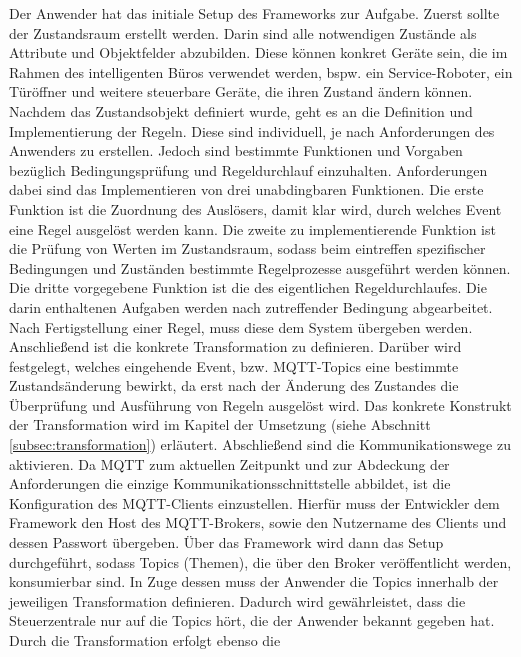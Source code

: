         Der Anwender hat das initiale Setup des Frameworks zur Aufgabe. Zuerst sollte der Zustandsraum erstellt werden. 
        Darin sind alle notwendigen Zustände als Attribute und Objektfelder abzubilden. Diese können konkret Geräte sein, die im Rahmen des 
        intelligenten Büros verwendet werden, bspw. ein Service-Roboter, ein Türöffner und weitere steuerbare Geräte, die 
        ihren Zustand ändern können. Nachdem das Zustandsobjekt 
        definiert wurde, geht es an die Definition und Implementierung der Regeln. Diese sind individuell, je nach 
        Anforderungen des Anwenders zu erstellen. Jedoch sind bestimmte Funktionen und Vorgaben bezüglich Bedingungsprüfung 
        und Regeldurchlauf einzuhalten. Anforderungen dabei sind das Implementieren von drei unabdingbaren Funktionen. 
        Die erste Funktion ist die Zuordnung des Auslösers, damit klar wird, durch welches Event eine Regel ausgelöst werden kann. 
        Die zweite zu implementierende Funktion ist die Prüfung von Werten im Zustandsraum, sodass beim eintreffen spezifischer 
        Bedingungen und Zuständen bestimmte Regelprozesse ausgeführt werden können. Die dritte vorgegebene Funktion ist die 
        des eigentlichen Regeldurchlaufes. Die darin enthaltenen Aufgaben werden nach zutreffender Bedingung abgearbeitet.
        \\
        Nach Fertigstellung einer Regel, muss diese dem System übergeben werden. Anschließend ist die 
        konkrete Transformation zu definieren. Darüber wird festgelegt, welches eingehende Event, bzw. \acs{MQTT}-Topics 
        eine bestimmte Zustandsänderung bewirkt, da erst nach der Änderung des Zustandes die Überprüfung und Ausführung 
        von Regeln ausgelöst wird. Das konkrete Konstrukt der Transformation wird im Kapitel der Umsetzung (siehe Abschnitt \ref{subsec:transformation}) 
        erläutert. Abschließend sind die Kommunikationswege zu aktivieren. 
        Da \acs{MQTT} zum aktuellen Zeitpunkt und zur Abdeckung der Anforderungen die einzige Kommunikationsschnittstelle 
        abbildet, ist die Konfiguration des \acs{MQTT}-Clients einzustellen. Hierfür muss der Entwickler 
        dem Framework den Host des \acs{MQTT}-Brokers, sowie den Nutzername des Clients und dessen Passwort übergeben. Über das 
        Framework wird dann das Setup durchgeführt, sodass Topics (Themen), die über den Broker veröffentlicht werden, konsumierbar 
        sind. In Zuge dessen muss der Anwender die Topics innerhalb der jeweiligen Transformation definieren. Dadurch wird gewährleistet, dass 
        die Steuerzentrale nur auf die Topics hört, die der Anwender bekannt gegeben hat. Durch die Transformation erfolgt ebenso die 
